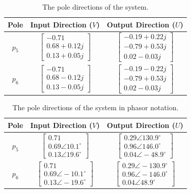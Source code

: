 \begin{table}[H]
	\centering
	\caption{The pole directions of the system.}
	\begin{tabular}{ccc}
		\hline
		\textbf{Pole} & \textbf{Input Direction ($V$)} & \textbf{Output Direction ($U$)} \\\hline
		$p_5$            & $ \begin{bmatrix} -0.71 \\ 0.68 + 0.12j \\ 0.13 + 0.05j\end{bmatrix} $ & $ \begin{bmatrix} -0.19+0.22j \\ -0.79+0.53j \\ 0.02 -0.03j\end{bmatrix} $ \\
		$p_6$            & $ \begin{bmatrix} -0.71 \\ 0.68 - 0.12j \\ 0.13 -0.05j\end{bmatrix} $ & $ \begin{bmatrix} -0.19-0.22j \\ -0.79+0.53j \\ 0.02 - 0.03j\end{bmatrix} $ \\\hline             
	\end{tabular}
	\label{tab: Pole Directions of system}
\end{table}

\begin{table}[H]
	\centering
	\caption{The pole directions of the system in phasor notation.}
	\begin{tabular}{ccc}
		\hline
		\textbf{Pole} & \textbf{Input Direction ($V$)} & \textbf{Output Direction ($U$)} \\\hline
		$p_5$            & $ \begin{bmatrix} 0.71 \\ 0.69\angle10.1^{\circ} \\ 0.13\angle19.6^{\circ}\end{bmatrix} $ & $ \begin{bmatrix} 0.29\angle130.9^{\circ} \\ 0.96\angle146.0^{\circ} \\ 0.04\angle-48.9^{\circ}\end{bmatrix} $ \\
		$p_6$            & $ \begin{bmatrix} 0.71 \\ 0.69\angle-10.1^{\circ} \\ 0.13\angle-19.6^{\circ}\end{bmatrix} $ & $ \begin{bmatrix} 0.29\angle-130.9^{\circ} \\ 0.96\angle-146.0^{\circ} \\ 0.04\angle48.9^{\circ}\end{bmatrix} $ \\\hline             
	\end{tabular}
	\label{tab: Pole Directions of system Phasor Notation}
\end{table}


